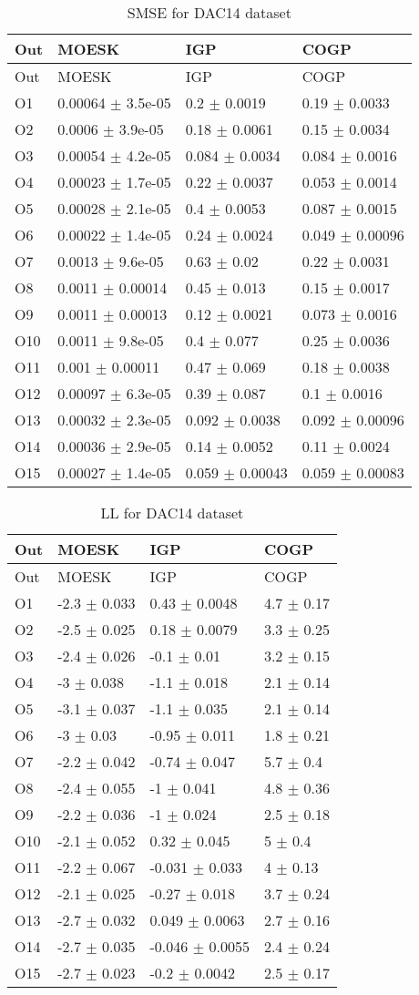 \begin{longtable}[]{@{}llll@{}}
\caption{SMSE for DAC14 dataset}\tabularnewline
\toprule
Out & MOESK & IGP & COGP\tabularnewline
\midrule
\endfirsthead
\toprule
Out & MOESK & IGP & COGP\tabularnewline
\midrule
\endhead
O1 & 0.00064 \(\pm\) 3.5e-05 & 0.2 \(\pm\) 0.0019 & 0.19 \(\pm\)
0.0033\tabularnewline
O2 & 0.0006 \(\pm\) 3.9e-05 & 0.18 \(\pm\) 0.0061 & 0.15 \(\pm\)
0.0034\tabularnewline
O3 & 0.00054 \(\pm\) 4.2e-05 & 0.084 \(\pm\) 0.0034 & 0.084 \(\pm\)
0.0016\tabularnewline
O4 & 0.00023 \(\pm\) 1.7e-05 & 0.22 \(\pm\) 0.0037 & 0.053 \(\pm\)
0.0014\tabularnewline
O5 & 0.00028 \(\pm\) 2.1e-05 & 0.4 \(\pm\) 0.0053 & 0.087 \(\pm\)
0.0015\tabularnewline
O6 & 0.00022 \(\pm\) 1.4e-05 & 0.24 \(\pm\) 0.0024 & 0.049 \(\pm\)
0.00096\tabularnewline
O7 & 0.0013 \(\pm\) 9.6e-05 & 0.63 \(\pm\) 0.02 & 0.22 \(\pm\)
0.0031\tabularnewline
O8 & 0.0011 \(\pm\) 0.00014 & 0.45 \(\pm\) 0.013 & 0.15 \(\pm\)
0.0017\tabularnewline
O9 & 0.0011 \(\pm\) 0.00013 & 0.12 \(\pm\) 0.0021 & 0.073 \(\pm\)
0.0016\tabularnewline
O10 & 0.0011 \(\pm\) 9.8e-05 & 0.4 \(\pm\) 0.077 & 0.25 \(\pm\)
0.0036\tabularnewline
O11 & 0.001 \(\pm\) 0.00011 & 0.47 \(\pm\) 0.069 & 0.18 \(\pm\)
0.0038\tabularnewline
O12 & 0.00097 \(\pm\) 6.3e-05 & 0.39 \(\pm\) 0.087 & 0.1 \(\pm\)
0.0016\tabularnewline
O13 & 0.00032 \(\pm\) 2.3e-05 & 0.092 \(\pm\) 0.0038 & 0.092 \(\pm\)
0.00096\tabularnewline
O14 & 0.00036 \(\pm\) 2.9e-05 & 0.14 \(\pm\) 0.0052 & 0.11 \(\pm\)
0.0024\tabularnewline
O15 & 0.00027 \(\pm\) 1.4e-05 & 0.059 \(\pm\) 0.00043 & 0.059 \(\pm\)
0.00083\tabularnewline
\bottomrule
\end{longtable}

\begin{longtable}[]{@{}llll@{}}
\caption{LL for DAC14 dataset}\tabularnewline
\toprule
Out & MOESK & IGP & COGP\tabularnewline
\midrule
\endfirsthead
\toprule
Out & MOESK & IGP & COGP\tabularnewline
\midrule
\endhead
O1 & -2.3 \(\pm\) 0.033 & 0.43 \(\pm\) 0.0048 & 4.7 \(\pm\)
0.17\tabularnewline
O2 & -2.5 \(\pm\) 0.025 & 0.18 \(\pm\) 0.0079 & 3.3 \(\pm\)
0.25\tabularnewline
O3 & -2.4 \(\pm\) 0.026 & -0.1 \(\pm\) 0.01 & 3.2 \(\pm\)
0.15\tabularnewline
O4 & -3 \(\pm\) 0.038 & -1.1 \(\pm\) 0.018 & 2.1 \(\pm\)
0.14\tabularnewline
O5 & -3.1 \(\pm\) 0.037 & -1.1 \(\pm\) 0.035 & 2.1 \(\pm\)
0.14\tabularnewline
O6 & -3 \(\pm\) 0.03 & -0.95 \(\pm\) 0.011 & 1.8 \(\pm\)
0.21\tabularnewline
O7 & -2.2 \(\pm\) 0.042 & -0.74 \(\pm\) 0.047 & 5.7 \(\pm\)
0.4\tabularnewline
O8 & -2.4 \(\pm\) 0.055 & -1 \(\pm\) 0.041 & 4.8 \(\pm\)
0.36\tabularnewline
O9 & -2.2 \(\pm\) 0.036 & -1 \(\pm\) 0.024 & 2.5 \(\pm\)
0.18\tabularnewline
O10 & -2.1 \(\pm\) 0.052 & 0.32 \(\pm\) 0.045 & 5 \(\pm\)
0.4\tabularnewline
O11 & -2.2 \(\pm\) 0.067 & -0.031 \(\pm\) 0.033 & 4 \(\pm\)
0.13\tabularnewline
O12 & -2.1 \(\pm\) 0.025 & -0.27 \(\pm\) 0.018 & 3.7 \(\pm\)
0.24\tabularnewline
O13 & -2.7 \(\pm\) 0.032 & 0.049 \(\pm\) 0.0063 & 2.7 \(\pm\)
0.16\tabularnewline
O14 & -2.7 \(\pm\) 0.035 & -0.046 \(\pm\) 0.0055 & 2.4 \(\pm\)
0.24\tabularnewline
O15 & -2.7 \(\pm\) 0.023 & -0.2 \(\pm\) 0.0042 & 2.5 \(\pm\)
0.17\tabularnewline
\bottomrule
\end{longtable}
